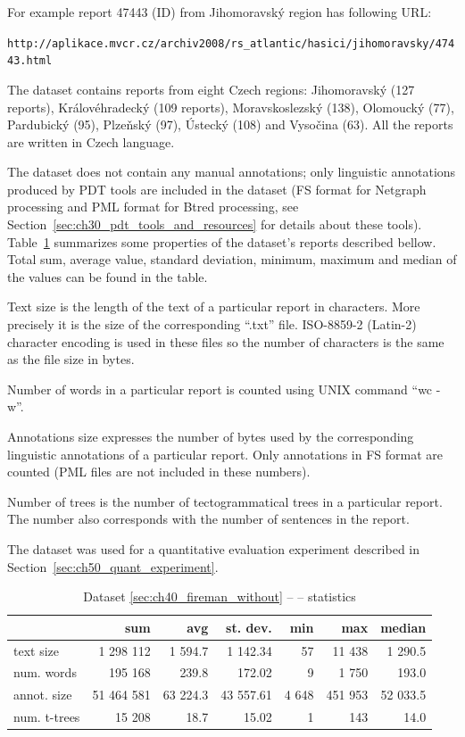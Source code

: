 For example report 47443 (ID) from Jihomoravský region has following URL:

\begin{center}
\verb+http://aplikace.mvcr.cz/archiv2008/rs_atlantic/hasici/jihomoravsky/47443.html+
\end{center}


The dataset contains reports from eight Czech regions: Jihomoravský (127 reports), Královéhradecký (109 reports), Moravskoslezský (138), Olomoucký (77), Pardubický (95), Plzeňský (97), Ústecký (108) and Vysočina (63). All the reports are written in Czech language. 

The dataset does not contain any manual annotations; only linguistic annotations produced by PDT tools are included in the dataset (FS format for Netgraph processing and PML format for Btred processing, see Section~\ref{sec:ch30_pdt_tools_and_resources} for details about these tools). Table~\ref{tab:ch40_fire_without} summarizes some properties of the dataset’s reports described bellow.  Total sum, average value, standard deviation, minimum, maximum and median of the values can be found in the table.


Text size is the length of the text of a particular report in characters. More precisely it is the size of the corresponding ``.txt'' file. ISO-8859-2 (Latin-2) character encoding is used in these files so the number of characters is the same as the file size in bytes. 

Number of words in a particular report is counted using UNIX command ``wc -w''.

Annotations size expresses the number of bytes used by the corresponding linguistic annotations of a particular report. Only annotations in FS format are counted (PML files are not included in these numbers).

Number of trees is the number of tectogrammatical trees in a particular report. The number also corresponds with the number of sentences in the report.


The dataset was used for a quantitative evaluation experiment described in Section~\ref{sec:ch50_quant_experiment}. 


\begin{table}
\centering
\begin{tabular}{|l|r|r|r|r|r|r|}
\hline
 & sum & avg & st. dev. & min & max & median\\
\hline
text size    &  1 298 112 &  1 594.7 &  1 142.34 &    57 &  11 438 &  1 290.5\\
num. words   &    195 168 &    239.8 &    172.02 &     9 &   1 750 &    193.0\\
annot. size  & 51 464 581 & 63 224.3 & 43 557.61 & 4 648 & 451 953 & 52 033.5\\
num. t-trees &     15 208 &     18.7 &     15.02 &     1 &     143 &     14.0\\
\hline
\end{tabular}
\caption{Dataset \ref{sec:ch40_fireman_without} --  -- statistics} \label{tab:ch40_fire_without}
\end{table}


